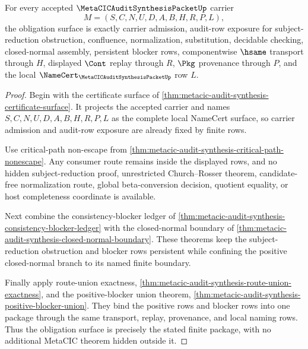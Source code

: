 \begin{theorem}
\label{thm:metacic-audit-synthesis-obligation-closure}
For every accepted $\MetaCICAuditSynthesisPacketUp$ carrier
$$
M=(S,C,N,U,D,A,B,H,R,P,L),
$$
the obligation surface is exactly carrier admission, audit-row exposure for subject-reduction obstruction, confluence, normalization, substitution, decidable checking, closed-normal assembly, persistent blocker rows, componentwise $\hsame$ transport through $H$, displayed $\Cont$ replay through $R$, $\Pkg$ provenance through $P$, and the local $\NameCert_{\MetaCICAuditSynthesisPacketUp}$ row $L$.
\end{theorem}
\begin{proof}
Begin with the certificate surface of \autoref{thm:metacic-audit-synthesis-certificate-surface}. It projects the accepted carrier and names $S,C,N,U,D,A,B,H,R,P,L$ as the complete local NameCert surface, so carrier admission and audit-row exposure are already fixed by finite rows.

Use critical-path non-escape from \autoref{thm:metacic-audit-synthesis-critical-path-nonescape}. Any consumer route remains inside the displayed rows, and no hidden subject-reduction proof, unrestricted Church--Rosser theorem, candidate-free normalization route, global beta-conversion decision, quotient equality, or host completeness coordinate is available.

Next combine the consistency-blocker ledger of \autoref{thm:metacic-audit-synthesis-consistency-blocker-ledger} with the closed-normal boundary of \autoref{thm:metacic-audit-synthesis-closed-normal-boundary}. These theorems keep the subject-reduction obstruction and blocker rows persistent while confining the positive closed-normal branch to its named finite boundary.

Finally apply route-union exactness, \autoref{thm:metacic-audit-synthesis-route-union-exactness}, and the positive-blocker union theorem, \autoref{thm:metacic-audit-synthesis-positive-blocker-union}. They bind the positive rows and blocker rows into one package through the same transport, replay, provenance, and local naming rows. Thus the obligation surface is precisely the stated finite package, with no additional MetaCIC theorem hidden outside it.
\end{proof}

